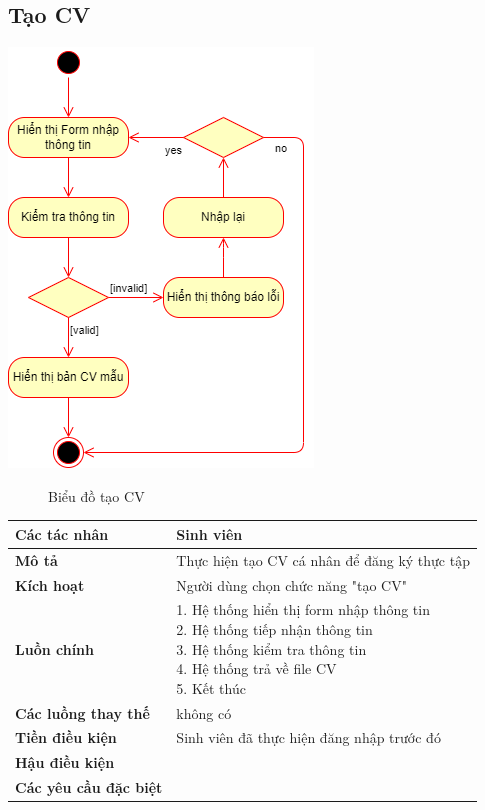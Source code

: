 \subsection{Tạo CV}
  \begin{center}
    \includegraphics[width=.7\textwidth]{../drawio/activity/create_CV.png}
    \begin{figure}[h]
      \centering
      \caption{Biểu đồ tạo CV}
    \end{figure}
  \end{center}
  \begin{tabular}{|l|l|}
    \hline
    \textbf{Các tác nhân}       & Sinh viên\\
    \hline
    \textbf{Mô tả}              & Thực hiện tạo CV cá nhân để đăng ký thực tập                                           \\
    \hline
    \textbf{Kích hoạt}          & Người dùng chọn chức năng "tạo CV" \\
    \hline
    \textbf{Luồn chính}         & \makecell[l]{1. Hệ thống hiển thị form nhập thông tin \\ 2. Hệ thống tiếp nhận thông tin \\ 3. Hệ thống kiểm tra thông tin \\ 4. Hệ thống trả về file CV \\ 5. Kết thúc} \\
    \hline
    \textbf{Các luồng thay thế} & không có                                                   \\
    \hline
    \textbf{Tiền điều kiện}     & Sinh viên đã thực hiện đăng nhập trước đó                                                   \\
    \hline
    \textbf{Hậu điều kiện}      &                                                     \\
    \hline
    \textbf{Các yêu cầu đặc biệt} & \\
    \hline
  \end{tabular}

